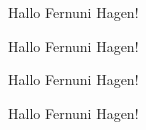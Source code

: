 \documentclass[12pt,ngerman]{scrartcl}
\begin{document}
\begin{tcolorbox}
Hallo Fernuni Hagen!
\end{tcolorbox}

\begin{tcolorbox}[colback=red!50]
Hallo Fernuni Hagen!
\end{tcolorbox}

\begin{tcolorbox}[colback=yellow!25,colframe=blue]
Hallo Fernuni Hagen!
\end{tcolorbox}

\begin{tcolorbox}[colback=yellow!25,colframe=blue,title={Meine Überschrift}]
Hallo Fernuni Hagen! \blindtext[3]
\end{tcolorbox}
\end{document}
